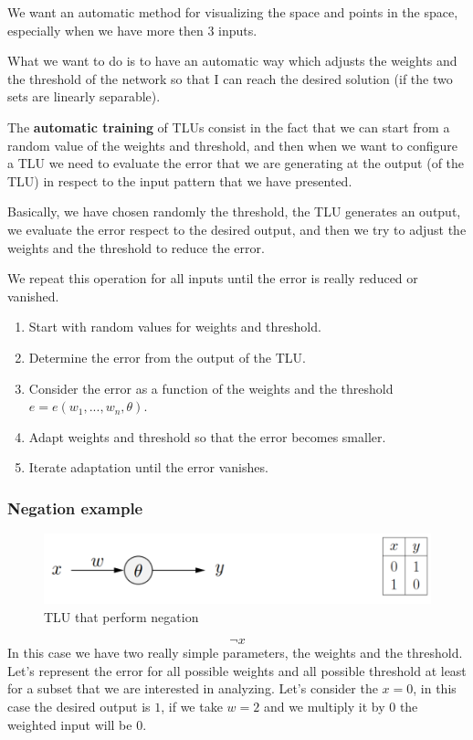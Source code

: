 \documentclass{article}
\begin{document}
We want an automatic method for visualizing the space and points in the space, especially when
we have more then $3$ inputs.

What we want to do is to have an automatic way which adjusts the weights and the threshold
of the network so that I can reach the desired solution (if the two sets are linearly separable).

The \textbf{automatic training} of TLUs consist in the fact that we can start from a random value
of the weights and threshold, and then when we want to configure a TLU we need to evaluate
the error that we are generating at the output (of the TLU) in respect to the input pattern
that we have presented.

Basically, we have chosen randomly the threshold, the TLU generates an output, we evaluate
the error respect to the desired output, and then we try to adjust the weights and the
threshold to reduce the error.

We repeat this operation for all inputs until the error is really reduced or vanished.
\begin{enumerate}
    \item Start with random values for weights and threshold.
    \item Determine the error from the output of the TLU.
    \item Consider the error as a function of the weights and the threshold $e=e(w_1,...,w_n,\theta)$.
    \item Adapt weights and threshold so that the error becomes smaller.
    \item Iterate adaptation until the error vanishes.
\end{enumerate}

\subsubsection{Negation example}
\begin{figure}[H]
    \centering
    \includegraphics[scale=1]{images/neg_example.png}
    \caption{TLU that perform negation}
    \label{fig:neg_example}
\end{figure}
$$\neg x$$
In this case we have two really simple parameters, the weights and the threshold.
Let’s represent the error for all possible weights and all possible threshold at least
for a subset that we are interested in analyzing. Let’s consider the $x=0$, in this case
the desired output is $1$, if we take $w=2$ and we multiply it by $0$ the weighted input
will be $0$.
\end{document}
